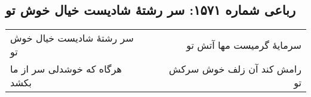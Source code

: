 \begin{center}
\section*{رباعی شماره ۱۵۷۱: سر رشتهٔ شادیست خیال خوش تو}
\label{sec:1571}
\begin{longtable}{l p{0.5cm} r}
سر رشتهٔ شادیست خیال خوش تو
&&
سرمایهٔ گرمیست مها آتش تو
\\
هرگاه که خوشدلی سر از ما بکشد
&&
رامش کند آن زلف خوش سرکش تو
\\
\end{longtable}
\end{center}
